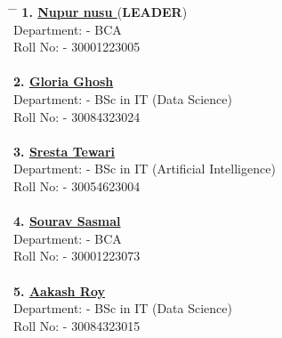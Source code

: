 \documentclass{article}
\begin{document}
\begin{tabbing}
    
    \hspace{5cm} \= \hspace{7cm} \= \kill
    \textbf{1. \underline{Nupur nusu }} (\textbf{LEADER}) \\
    \hspace{0.6cm}Department: - BCA \\
     \hspace{0.6 cm}Roll No: - 30001223005 \\
    
    \\
    \textbf{2. \underline{Gloria Ghosh}} \\
     \hspace{0.6 cm}Department: - BSc in IT (Data Science) \\
    \hspace{0.5 cm} Roll No: - 30084323024 \\
    \\
    \textbf{3. \underline{Sresta Tewari}} \\
    \hspace{0.4 cm} Department: - BSc in IT (Artificial Intelligence) \\
    \hspace{0.4 cm} Roll No: - 30054623004 \\
    \\
    \textbf{4. \underline{Sourav Sasmal}} \\
    \hspace{0.4 cm} Department: - BCA \\
    \hspace{0.4 cm} Roll No: - 30001223073 \\
    \\
    \textbf{5. \underline{Aakash Roy}} \\
     \hspace{0.6 cm}Department: - BSc in IT (Data Science) \\
    \hspace{0.5 cm} Roll No: - 30084323015 \\
\end{tabbing}


\newpage
{}
\end{document}
